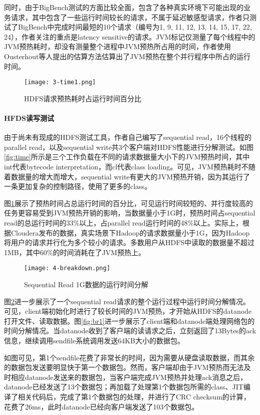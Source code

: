 \documentclass[lang=cn,12pt,a4paper,cite=authoryear]{elegantpaper}
\begin{document}
\begin{figure*}[!htp]
同时，由于BigBench测试的方面比较全面，包含了各种真实环境下可能出现的业务请求，其中包含了一些运行时间较长的请求，不属于延迟敏感型请求，作者只测试了BigBench中完成时间最短的10个请求（编号为1, 9, 11, 12, 13, 14, 15, 17, 22, 24），作者关注的重点是latency sensitive的请求。JVM标记仅测量了每个线程中的JVM预热耗时，却没有测量整个进程中JVM预热所占用的时间，作者使用Ousterhout等人提出的估算方法估算出了JVM预热在整个并行程序中所占的运行时间。

\begin{figure}
  \centering
  \texttt{[image: 3-time1.png]}
  \caption{HDFS请求预热耗时占运行时间百分比}
  \label{fig:time2}
\end{figure}

\paragraph{HFDS读写测试}
由于尚未有现成的HDFS测试工具，作者自己编写了sequential read，16个线程的parallel read，以及sequential write共3个客户端对HDFS性能进行分解测试。如图\ref{fig:time}所示是三个工作负载在不同的请求数据量大小下的JVM预热时间，其中int代表bytecode interpretation，而cl代表class loading。可见，JVM预热耗时不随着数据量的增大而增大，sequential write有更大的JVM预热开销，因为其运行了一条更加复杂的控制路径，使用了更多的class。

图\ref{fig:time2}展示了预热时间占总运行时间的百分比，可见运行时间较短的、并行度较高的任务更容易受到JVM预热开销的影响，当数据量小于1G时，预热时间占sequential read的总运行时间的33\%以上，占parallel read运行时间的48\%以上。实际上，根据Cloudera发布的数据，真实场景下Hadoop的请求数据量小于1G，因为Hadoop将用户的请求并行化为多个较小的请求。多数用户从HDFS中读取的数据量不超过1MB，其中60\%的时间消耗在了JVM预热上。

\begin{figure}[!htp]
  \centering
  \texttt{[image: 4-breakdown.png]}
  \caption{Sequential Read 1G数据的运行时间分解}
  \label{fig:br}
\end{figure}

图\ref{fig:br}进一步展示了一个sequential read请求的整个运行过程中运行时间分解情况。可见，client端初始化时进行了较长时间的JVM预热，才开始从HDFS的datanode打开文件、读取数据。图\ref{fig:br1}进一步展示了client端和datanode端处理网络包的时间分解情况。当datanode收到了客户端的读请求之后，立刻返回了13Bytes的ack信息，继续调用sendfile系统调用发送64KB大小的数据包。

如图可见，第1个sendfile花费了非常长的时间，因为需要从硬盘读取数据，而其余的数据包发送要明显快于第一个数据包。然而，客户端却由于JVM预热而无法及时相应datanode发送来的数据包，当客户端完成JVM预热并处理ack消息之后，datanode已经发送了13个数据包；再加载了处理第1个数据包所需的class、JIT编译了相关代码后，完成了第1个数据包的处理，并进行了CRC checksum的计算，花费了26ms，此时datanode已经向客户端发送了103个数据包。


\end{figure*}
\end{document}
